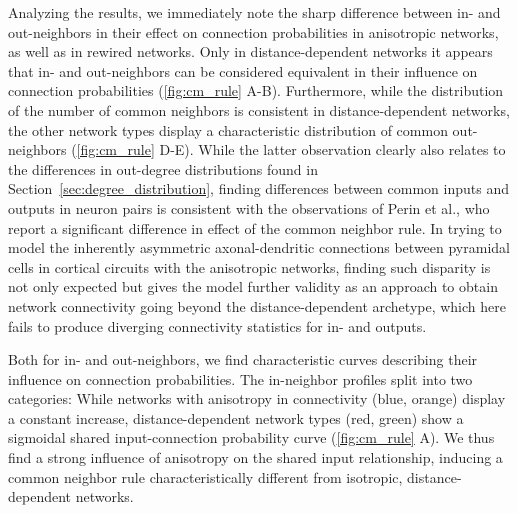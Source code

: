 Analyzing the results, we immediately note the sharp difference
between in- and out-neighbors in their effect on connection
probabilities in anisotropic networks, as well as in rewired
networks. Only in distance-dependent networks it appears that in- and
out-neighbors can be considered equivalent in their influence on
connection probabilities (\autoref{fig:cm_rule} A-B). Furthermore,
while the distribution of the number of common neighbors is consistent
in distance-dependent networks, the other network types display a
characteristic distribution of common out-neighbors
(\autoref{fig:cm_rule} D-E). While the latter observation clearly also
relates to the differences in out-degree distributions found in
Section~\ref{sec:degree_distribution}, finding differences between
common inputs and outputs in neuron pairs is consistent with the
observations of Perin et al., who report a significant difference in
effect of the common neighbor rule. In trying to model the inherently
asymmetric axonal-dendritic connections between pyramidal cells in
cortical circuits with the anisotropic networks, finding such
disparity is not only expected but gives the model further validity as
an approach to obtain network connectivity going beyond the
distance-dependent archetype, which here fails to produce diverging
connectivity statistics for in- and outputs.

Both for in- and out-neighbors, we find characteristic curves
describing their influence on connection probabilities. The
in-neighbor profiles split into two categories: While networks with
anisotropy in connectivity (blue, orange) display a constant increase,
distance-dependent network types (red, green)  show a sigmoidal shared
input-connection probability curve (\autoref{fig:cm_rule} A).  We thus
find a strong influence of anisotropy on the shared input
relationship, inducing a common neighbor rule characteristically
different from isotropic, distance-depen\-dent networks.


